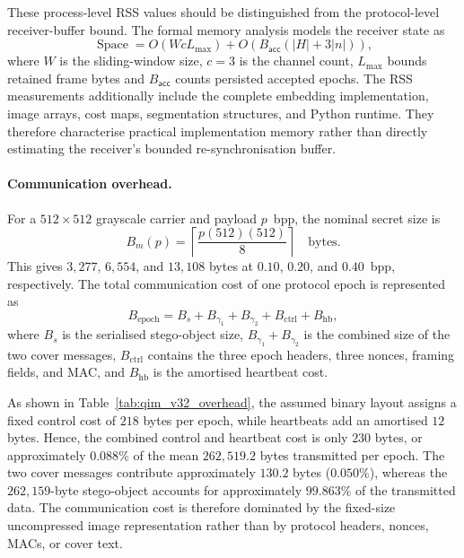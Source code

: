 \documentclass[journal]{IEEEtran}
\theoremstyle{definition}
\theoremstyle{game}
\begin{document}
These process-level RSS values should be distinguished from the
protocol-level receiver-buffer bound. The formal memory analysis
models the receiver state as
\begin{equation}
\operatorname{Space}
=O(WcL_{\max})+O\!\left(B_{\mathsf{acc}}(|H|+3|n|)\right),
\end{equation}
where $W$ is the sliding-window size, $c=3$ is the channel count,
$L_{\max}$ bounds retained frame bytes and $B_{\mathsf{acc}}$ counts
persisted accepted epochs. The RSS measurements additionally include the complete
embedding implementation, image arrays, cost maps, segmentation
structures, and Python runtime. They therefore characterise
practical implementation memory rather than directly estimating
the receiver's bounded re-synchronisation buffer.

\paragraph{Communication overhead.}
For a $512\times512$ grayscale carrier and payload $p$~bpp, the
nominal secret size is
\begin{equation}
B_m(p)
=
\left\lceil
\frac{p(512)(512)}{8}
\right\rceil
\quad\text{bytes}.
\end{equation}
This gives $3{,}277$, $6{,}554$, and $13{,}108$ bytes at
$0.10$, $0.20$, and $0.40$~bpp, respectively. The total
communication cost of one protocol epoch is represented as
\begin{equation}
B_{\mathrm{epoch}}
=
B_s
+
B_{\gamma_1}
+
B_{\gamma_2}
+
B_{\mathrm{ctrl}}
+
B_{\mathrm{hb}},
\end{equation}
where $B_s$ is the serialised stego-object size,
$B_{\gamma_1}+B_{\gamma_2}$ is the combined size of the two
cover messages, $B_{\mathrm{ctrl}}$ contains the three epoch
headers, three nonces, framing fields, and MAC, and
$B_{\mathrm{hb}}$ is the amortised heartbeat cost.

As shown in Table~\ref{tab:qim_v32_overhead}, the assumed binary
layout assigns a fixed control cost of $218$ bytes per epoch,
while heartbeats add an amortised $12$ bytes. Hence, the combined
control and heartbeat cost is only $230$ bytes, or approximately
$0.088\%$ of the mean $262{,}519.2$ bytes transmitted per epoch.
The two cover messages contribute approximately $130.2$ bytes
($0.050\%$), whereas the $262{,}159$-byte stego-object accounts
for approximately $99.863\%$ of the transmitted data. The
communication cost is therefore dominated by the fixed-size
uncompressed image representation rather than by protocol
headers, nonces, MACs, or cover text.
\end{document}
